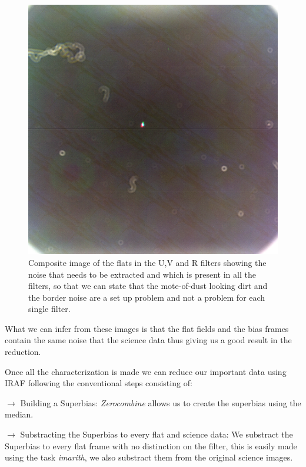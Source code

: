 \begin{figure}[]
  \hfill
  \begin{minipage}[b]{0.47\textwidth}
    \includegraphics[width=\textwidth]{images/ruido.png}
    \caption[Clean image of NGC5139]{Composite image of the flats in the U,V and R filters showing the noise that needs to be extracted and which is present in all the filters, so that we can state that the mote-of-dust looking dirt and the border noise are a set up problem and not a problem for each single filter.}
  \end{minipage}
\end{figure}

What we can infer from these images is that the flat fields and the bias frames contain the same noise that the science data thus giving us a good result in the reduction.

Once all the characterization is made we can reduce our important data using IRAF following the conventional steps consisting of: 

$\rightarrow$ Building a Superbias: \textit{Zerocombine} allows us to create the superbias using the median.

$\rightarrow$ Substracting the Superbias to every flat and science data: We substract the Superbias to every flat frame with no distinction on the filter, this is easily made using the task \textit{imarith}, we also substract them from the original science images.

